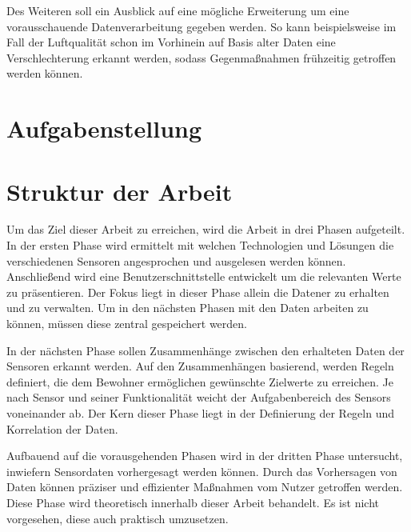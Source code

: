 Des Weiteren soll ein Ausblick auf eine mögliche Erweiterung um eine vorausschauende Datenverarbeitung gegeben werden. So kann beispielsweise im Fall der Luftqualität schon im Vorhinein auf Basis alter Daten eine Verschlechterung erkannt werden, sodass Gegenmaßnahmen frühzeitig getroffen werden können.
\section{Aufgabenstellung}
\section{Struktur der Arbeit}
Um das Ziel dieser Arbeit zu erreichen, wird die Arbeit in drei Phasen aufgeteilt. In der ersten Phase wird ermittelt mit welchen Technologien und Lösungen die verschiedenen Sensoren angesprochen und ausgelesen werden können. Anschließend wird eine Benutzerschnittstelle entwickelt um die relevanten Werte zu präsentieren. Der Fokus liegt in dieser Phase allein die Datener zu erhalten und zu verwalten. Um in den nächsten Phasen mit den Daten arbeiten zu können, müssen diese zentral gespeichert werden.

In der nächsten Phase sollen Zusammenhänge zwischen den erhalteten Daten der Sensoren erkannt werden. Auf den Zusammenhängen basierend, werden Regeln definiert, die dem Bewohner ermöglichen gewünschte Zielwerte zu erreichen. Je nach Sensor und seiner Funktionalität weicht der Aufgabenbereich des Sensors voneinander ab. Der Kern dieser Phase liegt in der Definierung der Regeln und Korrelation der Daten.

Aufbauend auf die vorausgehenden Phasen wird in der dritten Phase untersucht, inwiefern Sensordaten vorhergesagt werden können. Durch das Vorhersagen von Daten können präziser und effizienter Maßnahmen vom Nutzer getroffen werden. Diese Phase wird theoretisch innerhalb dieser Arbeit behandelt. Es ist nicht vorgesehen, diese auch praktisch umzusetzen.